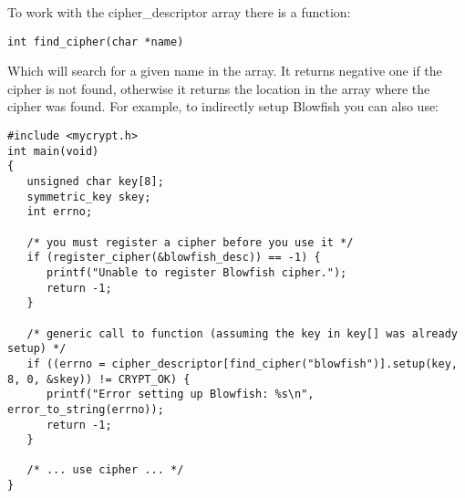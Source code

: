 \documentclass{book}
\begin{document}
To work with the cipher\_descriptor array there is a function:
\begin{verbatim}
int find_cipher(char *name)
\end{verbatim}
Which will search for a given name in the array.  It returns negative one if the cipher is not found, otherwise it returns
the location in the array where the cipher was found.  For example, to indirectly setup Blowfish you can also use:
\begin{small}
\begin{verbatim}
#include <mycrypt.h>
int main(void)
{
   unsigned char key[8];
   symmetric_key skey;
   int errno;

   /* you must register a cipher before you use it */
   if (register_cipher(&blowfish_desc)) == -1) {
      printf("Unable to register Blowfish cipher.");
      return -1;
   }

   /* generic call to function (assuming the key in key[] was already setup) */
   if ((errno = cipher_descriptor[find_cipher("blowfish")].setup(key, 8, 0, &skey)) != CRYPT_OK) {
      printf("Error setting up Blowfish: %s\n", error_to_string(errno));
      return -1;
   }

   /* ... use cipher ... */
}
\end{verbatim}
\end{small}
\end{document}
